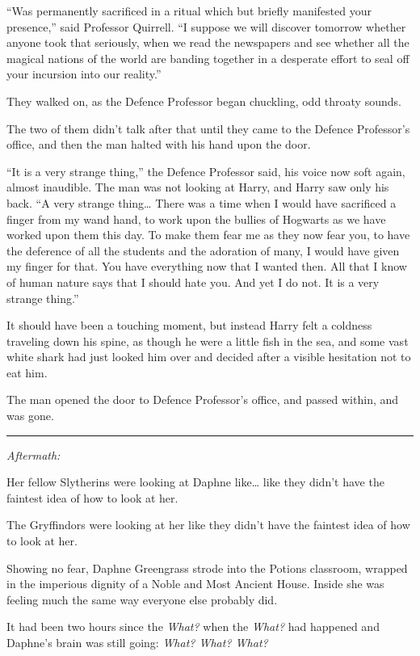``Was permanently sacrificed in a ritual which but briefly manifested
your presence,'' said Professor Quirrell. ``I suppose we will discover
tomorrow whether anyone took that seriously, when we read the newspapers
and see whether all the magical nations of the world are banding
together in a desperate effort to seal off your incursion into our
reality.''

They walked on, as the Defence Professor began chuckling, odd throaty
sounds.

The two of them didn't talk after that until they came to the Defence
Professor's office, and then the man halted with his hand upon the door.

``It is a very strange thing,'' the Defence Professor said, his voice
now soft again, almost inaudible. The man was not looking at Harry, and
Harry saw only his back. ``A very strange thing\ldots{} There was a time
when I would have sacrificed a finger from my wand hand, to work upon
the bullies of Hogwarts as we have worked upon them this day. To make
them fear me as they now fear you, to have the deference of all the
students and the adoration of many, I would have given my finger for
that. You have everything now that I wanted then. All that I know of
human nature says that I should hate you. And yet I do not. It is a very
strange thing.''

It should have been a touching moment, but instead Harry felt a coldness
traveling down his spine, as though he were a little fish in the sea,
and some vast white shark had just looked him over and decided after a
visible hesitation not to eat him.

The man opened the door to Defence Professor's office, and passed
within, and was gone.

\begin{center}\rule{3in}{0.4pt}\end{center}

\emph{Aftermath:}

Her fellow Slytherins were looking at Daphne like\ldots{} like they
didn't have the faintest idea of how to look at her.

The Gryffindors were looking at her like they didn't have the faintest
idea of how to look at her.

Showing no fear, Daphne Greengrass strode into the Potions classroom,
wrapped in the imperious dignity of a Noble and Most Ancient House.
Inside she was feeling much the same way everyone else probably did.

It had been two hours since the \emph{What?} when the \emph{What?} had
happened and Daphne's brain was still going: \emph{What? What? What?}

